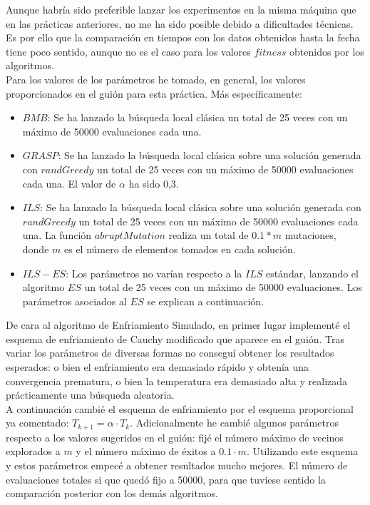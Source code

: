 \documentclass[11pt,a4paper]{article}
\begin{document}
	Aunque habría sido preferible lanzar los experimentos en la misma máquina que en las prácticas anteriores, no me ha sido posible debido a dificultades técnicas. Es por ello que la comparación en tiempos con los datos obtenidos hasta la fecha tiene poco sentido, aunque no es el caso para los valores $fitness$ obtenidos por los algoritmos. \\
	
	Para los valores de los parámetros he tomado, en general, los valores proporcionados en el guión para esta práctica. Más específicamente:
	
	\begin{itemize}
		\item $BMB$: Se ha lanzado la búsqueda local clásica un total de 25 veces con un máximo de 50000 evaluaciones cada una.
		\item $GRASP$: Se ha lanzado la búsqueda local clásica sobre una solución generada con $randGreedy$ un total de 25 veces con un máximo de 50000 evaluaciones cada una. El valor de $\alpha$ ha sido 0,3.
		\item $ILS$: Se ha lanzado la búsqueda local clásica sobre una solución generada con $randGreedy$ un total de 25 veces con un máximo de 50000 evaluaciones cada una. La función $abruptMutation$ realiza un total de $0.1*m$ mutaciones, donde $m$ es el número de elementos tomados en cada solución.
		\item $ILS-ES$: Los parámetros no varían respecto a la $ILS$ estándar, lanzando el algoritmo $ES$ un total de 25 veces con un máximo de 50000 evaluaciones. Los parámetros asociados al $ES$ se explican a continuación.
	\end{itemize}

	De cara al algoritmo de Enfriamiento Simulado, en primer lugar implementé el esquema de enfriamiento de Cauchy modificado que aparece en el guión. Tras variar los parámetros de diversas formas no conseguí obtener los resultados esperados: o bien el enfriamiento era demasiado rápido y obtenía una convergencia prematura, o bien la temperatura era demasiado alta y realizada prácticamente una búsqueda aleatoria. \\
	
	A continuación cambié el esquema de enfriamiento por el esquema proporcional ya comentado: $T_{k+1} = \alpha \cdot T_k$. Adicionalmente he cambié algunos parámetros respecto a los valores sugeridos en el guión: fijé el número máximo de vecinos explorados a $m$ y el número máximo de éxitos a $0.1 \cdot m$. Utilizando este esquema y estos parámetros empecé a obtener resultados mucho mejores. El número de evaluaciones totales si que quedó fijo a 50000, para que tuviese sentido la comparación posterior con los demás algoritmos. \\
	
\end{document}
